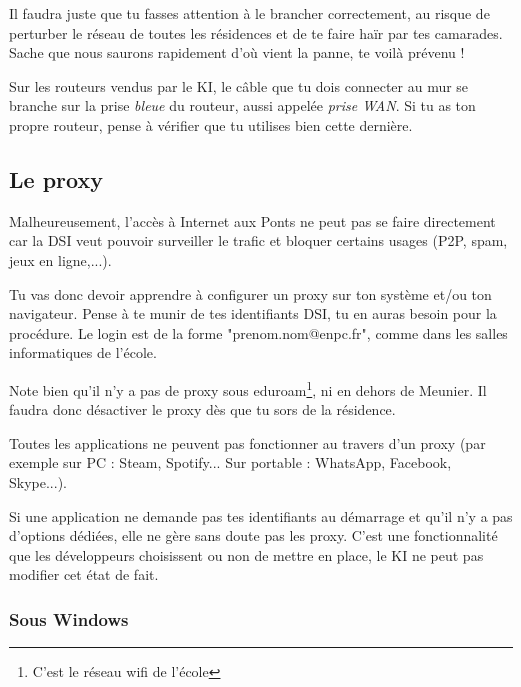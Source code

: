 \documentclass{../templates/enpc-ki/ki020}
\begin{document}
    Il faudra juste que tu fasses attention à le brancher correctement, au risque de perturber le réseau de toutes les résidences et de te faire haïr par tes camarades. Sache que nous saurons rapidement d’où vient la panne, te voilà prévenu !

    Sur les routeurs vendus par le KI, le câble que tu dois connecter au mur se branche sur la prise \emph{bleue} du routeur, aussi appelée \emph{prise WAN}. Si tu as ton propre routeur, pense à vérifier que tu utilises bien cette dernière.



  \newpage
    \subsection{Le proxy}
    {Malheureusement, l’accès à Internet aux Ponts ne peut pas se faire directement car la DSI veut pouvoir surveiller le trafic et bloquer certains usages (P2P, spam, jeux en ligne,...).}

    Tu vas donc devoir apprendre à configurer un proxy sur ton système et/ou ton navigateur. Pense à te munir de tes identifiants DSI, tu en auras besoin pour la procédure. Le login est de la forme "prenom.nom@enpc.fr", comme dans les salles informatiques de l'école.

    Note bien qu'il n'y a pas de proxy sous eduroam\footnote{C'est le réseau wifi de l'école}, ni en dehors de Meunier. Il faudra donc désactiver le proxy dès que tu sors de la résidence.

    \begin{kiframe}
      Toutes les applications ne peuvent pas fonctionner au travers d'un proxy (par exemple sur PC : Steam, Spotify... Sur portable : WhatsApp, Facebook, Skype...).

      Si une application ne demande pas tes identifiants au démarrage et qu'il n'y a pas d'options dédiées, elle ne gère sans doute pas les proxy. C'est une fonctionnalité que les développeurs choisissent ou non de mettre en place, le KI ne peut pas modifier cet état de fait.
    \end{kiframe}

\newpage
      \subsubsection{Sous Windows}
\end{document}
